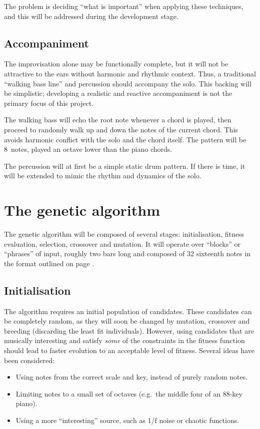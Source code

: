The problem is deciding ``what is important'' when applying these techniques, and this will be addressed during the development stage.

\subsection{Accompaniment}

The improvisation alone may be functionally complete, but it will not be attractive to the ears without harmonic and rhythmic context. Thus, a traditional ``walking bass line'' and percussion should accompany the solo. This backing will be simplistic; developing a realistic and reactive accompaniment is not the primary focus of this project.

The walking bass will echo the root note whenever a chord is played, then proceed to randomly walk up and down the notes of the current chord. This avoids harmonic conflict with the solo and the chord itself. The pattern will be 8\th\ notes, played an octave lower than the piano chords.

The percussion will at first be a simple static drum pattern. If there is time, it will be extended to mimic the rhythm and dynamics of the solo.

\section{The genetic algorithm}

The genetic algorithm will be composed of several stages: initialisation, fitness evaluation, selection, crossover and mutation. It will operate over ``blocks'' or ``phrases'' of input, roughly two bars long and composed of 32 sixteenth notes in the format outlined on page \pageref{fig-notearray}.

\subsection{Initialisation}

The algorithm requires an initial population of candidates. These candidates can be completely random, as they will soon be changed by mutation, crossover and breeding (discarding the least fit individuals). However, using candidates that are musically interesting and satisfy \emph{some} of the constraints in the fitness function should lead to faster evolution to an acceptable level of fitness. Several ideas have been considered:

\begin{itemize}
\item Using notes from the correct scale and key, instead of purely random notes.
\item Limiting notes to a small set of octaves (e.g.\ the middle four of an 88-key piano).
\item Using a more ``interesting'' source, such as 1/f noise or chaotic functions.
\end{itemize}

